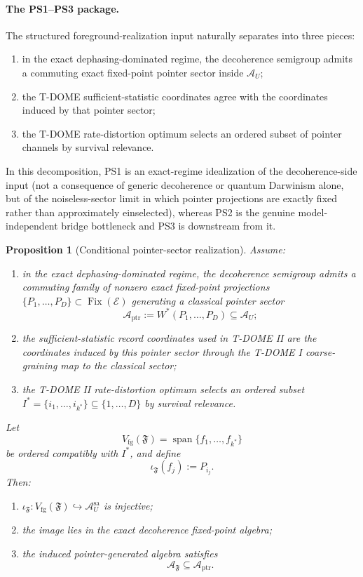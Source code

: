 \documentclass[12pt]{article}
\newtheorem{proposition}[theorem]{Proposition}
\theoremstyle{definition}
\theoremstyle{remark}
\begin{document}
\paragraph{The PS1--PS3 package.}
The structured foreground-realization input naturally separates into
three pieces:
\begin{enumerate}
\item[(PS1)] in the exact dephasing-dominated regime, the decoherence
  semigroup admits a commuting exact fixed-point pointer sector inside
  \(\mathcal A_U\);
\item[(PS2)] the T-DOME sufficient-statistic coordinates agree with the
  coordinates induced by that pointer sector;
\item[(PS3)] the T-DOME rate-distortion optimum selects an ordered
  subset of pointer channels by survival relevance.
\end{enumerate}
In this decomposition, PS1 is an exact-regime idealization of the
decoherence-side input (not a consequence of generic decoherence or
quantum Darwinism alone, but of the noiseless-sector limit in which
pointer projections are exactly fixed rather than approximately
einselected), whereas PS2 is the genuine model-independent bridge
bottleneck and PS3 is downstream from it.

\begin{proposition}[Conditional pointer-sector realization]\label{prop:pointersector}
Assume:
\begin{enumerate}
\item[(PS1)] in the exact dephasing-dominated regime, the decoherence
  semigroup admits a commuting family of nonzero exact fixed-point
  projections
  \(\{P_1,\dots,P_D\}\subset \operatorname{Fix}(\mathcal E)\)
  generating a classical pointer sector
  \[
  \mathcal A_{\mathrm{ptr}}:=W^*(P_1,\dots,P_D)\subseteq \mathcal A_U;
  \]
\item[(PS2)] the sufficient-statistic record coordinates used in T-DOME II are
  the coordinates induced by this pointer sector through the T-DOME I
  coarse-graining map to the classical sector;
\item[(PS3)] the T-DOME II rate-distortion optimum selects an ordered subset
  \(I^*=\{i_1,\dots,i_{k^*}\}\subseteq \{1,\dots,D\}\) by survival
  relevance.
\end{enumerate}
Let
\[
V_{\mathrm{fg}}(\mathfrak F)=\operatorname{span}\{f_1,\dots,f_{k^*}\}
\]
be ordered compatibly with \(I^*\), and define
\[
\iota_{\mathfrak F}(f_j):=P_{i_j}.
\]
Then:
\begin{enumerate}
\item \(\iota_{\mathfrak F}:V_{\mathrm{fg}}(\mathfrak F)\hookrightarrow
  \mathcal A_U^{\mathrm{sa}}\) is injective;
\item the image lies in the exact decoherence fixed-point algebra;
\item the induced pointer-generated algebra satisfies
  \[
  \mathcal A_{\mathfrak F}\subseteq \mathcal A_{\mathrm{ptr}}.
  \]
\end{enumerate}
\end{proposition}
\end{document}
